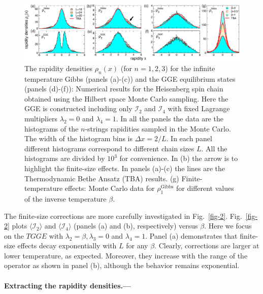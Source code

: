 \documentclass[twocolumn,superscriptaddress,prb,10pt]{revtex4-1}
\begin{document}
\begin{figure}[t]
\includegraphics*[width=0.99\linewidth]{./draft_figs/fig2}
\caption{The rapidity densities $\rho_n(x)$ (for $n=1,2,3$) for the infinite temperature 
 Gibbs (panels (a)-(c)) and the GGE equilibrium states (panels (d)-(f)): Numerical  
 results for the Heisenberg spin chain obtained using the Hilbert space Monte Carlo 
 sampling. Here the GGE is constructed including only ${\mathcal I}_2$ and ${\mathcal I}_4$ 
 with fixed Lagrange multipliers $\lambda_2=0$ and $\lambda_4=1$. In all the panels the 
 data are the histograms of the $n$-strings rapidities sampled in the Monte Carlo.
 The width of the histogram bins is $\Delta x=2/L$. In each panel different histograms 
 correspond to different chain sizes $L$. All the histograms are divided by $10^3$ for 
 convenience. In (b) the arrow is to highlight the finite-size effects. In panels (a)-(c) 
 the lines are the Thermodynamic Bethe Ansatz (TBA) results. (g) Finite-temperature 
 effects: Monte Carlo data for $\rho^{\textrm{Gibbs}}_1$ for different values of the 
 inverse temperature $\beta$.
}
\label{fig1}
\end{figure}


The finite-size corrections are more carefully investigated in Fig.~\ref{fig-2}.  
Fig.~\ref{fig-2} plots $\langle{\mathcal I}_2\rangle$ and $\langle {\mathcal I}_4
\rangle$ (panels (a) and (b), respectively) versus $\beta$. Here we focus on 
the $TGGE$ with $\lambda_2=\beta,\lambda_3=0$ and $\lambda_4=1$. Panel (a) 
demonstrates that finite-size effects decay exponentially with $L$ for any 
$\beta$. Clearly, corrections are larger at lower temperature, as expected.  
Moreover, they increase with the range of the operator as shown in panel (b), 
although the behavior remains exponential. 

\paragraph*{Extracting the rapidity densities.---}
\end{document}
